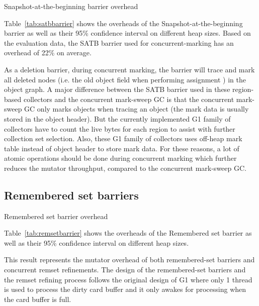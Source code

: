 \begin{table*}
  \centering
  
  \caption{Snapshot-at-the-beginning barrier overhead}
  \label{tab:satbbarrier}
\end{table*}

Table~\ref{tab:satbbarrier} shows the overheads of the Snapshot-at-the-beginning barrier
as well as their 95\% confidence interval on different heap sizes. Based on the evaluation data, the SATB barrier used for concurrent-marking
has an overhead of 22\% on average.

As a deletion barrier, during concurrent marking, the barrier will trace and mark
all deleted nodes (i.e. the old object field when performing assignment ) in the object graph.
A major difference between the SATB barrier used in these region-based collectors and
the concurrent mark-sweep GC is that the concurrent mark-sweep GC only marks objects
when tracing an object (the mark data is usually stored in the object header).
But the currently implemented G1 family of collectors have to count the live bytes
for each region to assist with further collection set selection.
Also, these G1 family of collectors uses off-heap mark table instead of object header to store
mark data. For these reasons, a lot of atomic operations should be done during concurrent
marking which further reduces the mutator throughput, compared to the concurrent mark-sweep GC.

\subsection{Remembered set barriers}

\begin{table*}
  \centering
  
  \caption{Remembered set barrier overhead}
  \label{tab:remsetbarrier}
\end{table*}

Table~\ref{tab:remsetbarrier} shows the overheads of the Remembered set barrier
as well as their 95\% confidence interval on different heap sizes.

This result represents the mutator overhead of both remembered-set barriers and concurrent remset refinements.
The design of the remembered-set barriers and the remset refining process follows
the original design of G1 where only 1 thread is used to process the dirty card
buffer and it only awakes for processing when the card buffer is full.


